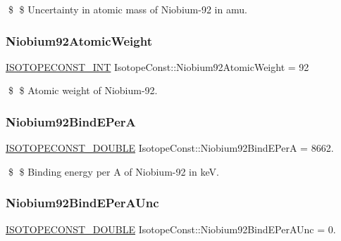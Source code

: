 \$ \$ Uncertainty in atomic mass of Niobium-\/92 in amu. \mbox{\label{group___isotope_const-_niobium-_nb92_gac2c7ddc0c0627bb86c10763f195cbb58}} 
\subsubsection{\texorpdfstring{Niobium92\+Atomic\+Weight}{Niobium92AtomicWeight}}
{\footnotesize\ttfamily \mbox{\hyperlink{group___isotope_const-_macros_ga5f18360b3e99483a35c32d789e62621c}{I\+S\+O\+T\+O\+P\+E\+C\+O\+N\+S\+T\+\_\+\+I\+NT}} Isotope\+Const\+::\+Niobium92\+Atomic\+Weight = 92}

\$ \$ Atomic weight of Niobium-\/92. \mbox{\label{group___isotope_const-_niobium-_nb92_ga56d1f4252b27e9671246a31777623874}} 
\subsubsection{\texorpdfstring{Niobium92\+Bind\+E\+PerA}{Niobium92BindEPerA}}
{\footnotesize\ttfamily \mbox{\hyperlink{group___isotope_const-_macros_ga8f45a7272ce02c0b4c65c44636ed719a}{I\+S\+O\+T\+O\+P\+E\+C\+O\+N\+S\+T\+\_\+\+D\+O\+U\+B\+LE}} Isotope\+Const\+::\+Niobium92\+Bind\+E\+PerA = 8662.}

\$ \$ Binding energy per A of Niobium-\/92 in keV. \mbox{\label{group___isotope_const-_niobium-_nb92_gaf5229d8e8932a1d75802195fe46524f8}} 
\subsubsection{\texorpdfstring{Niobium92\+Bind\+E\+Per\+A\+Unc}{Niobium92BindEPerAUnc}}
{\footnotesize\ttfamily \mbox{\hyperlink{group___isotope_const-_macros_ga8f45a7272ce02c0b4c65c44636ed719a}{I\+S\+O\+T\+O\+P\+E\+C\+O\+N\+S\+T\+\_\+\+D\+O\+U\+B\+LE}} Isotope\+Const\+::\+Niobium92\+Bind\+E\+Per\+A\+Unc = 0.}

